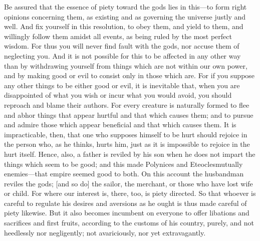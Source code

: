 Be assured  that the essence  of piety toward the  gods lies in  this---to form
right  opinions concerning  them, as  existing  and as  governing the  universe
justly and well. And  fix yourself in this resolution, to  obey them, and yield
to them,  and willingly follow  them amidst all events,  as being ruled  by the
most perfect  wisdom. For  thus you will  never find fault  with the  gods, nor
accuse them of neglecting  you. And it is not possible for  this to be affected
in any other way than by withdrawing  yourself from things which are not within
our own power, and  by making good or evil to consist only  in those which are.
For if you suppose any other things to be either good or evil, it is inevitable
that, when you are disappointed of what you wish or incur what you would avoid,
you should  reproach and blame their  authors. For every creature  is naturally
formed to flee and abhor things that appear hurtful and that which causes them;
and to  pursue and admire those  which appear beneficial and  that which causes
them.  It is  impracticable, then,  that one  who supposes  himself to  be hurt
should  rejoice in  the person  who, as  he thinks,  hurts him,  just as  it is
impossible to rejoice in  the hurt itself. Hence, also, a  father is reviled by
his son when he does not impart the things which seem to be good; and this made
Polynices and Eteocles\footnotemark mutually  enemies---that empire seemed good
to both.  On this  account the  husbandman reviles  the gods;  [and so  do] the
sailor, the  merchant, or  those who  have lost  wife or  child. For  where our
interest  is, there,  too, is  piety directed.  So that  whoever is  careful to
regulate his desires  and aversions as he  ought is thus made  careful of piety
likewise. But  it also  becomes incumbent  on everyone  to offer  libations and
sacrifices and first  fruits, according to the customs of  his country, purely,
and not  heedlessly nor negligently;  not avariciously, nor  yet extravagantly.
